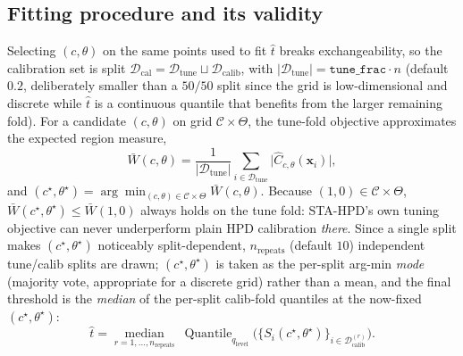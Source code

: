 \documentclass[10pt,twocolumn,a4paper]{article}
\begin{document}
\subsection{Fitting procedure and its validity}
Selecting $(c,\theta)$ on the same points used to fit $\hat t$ breaks exchangeability, so the
calibration set is split $\mathcal D_{\mathrm{cal}} = \mathcal D_{\mathrm{tune}}\sqcup\mathcal D_{\mathrm{calib}}$,
with $|\mathcal D_{\mathrm{tune}}| = \texttt{tune\_frac}\cdot n$ (default $0.2$, deliberately smaller
than a $50/50$ split since the grid is low-dimensional and discrete while $\hat t$ is a continuous
quantile that benefits from the larger remaining fold). For a candidate $(c,\theta)$ on grid
$\mathcal C\times\Theta$, the tune-fold objective approximates the expected region measure,
\begin{equation}
\bar W(c,\theta) = \frac{1}{|\mathcal D_{\mathrm{tune}}|}\sum_{i\in\mathcal D_{\mathrm{tune}}}
\big|\hat C_{c,\theta}(\bm x_i)\big|,
\end{equation}
and $(c^\star,\theta^\star) = \arg\min_{(c,\theta)\in\mathcal C\times\Theta}\bar W(c,\theta)$.
Because $(1,0)\in\mathcal C\times\Theta$, $\bar W(c^\star,\theta^\star)\le \bar W(1,0)$ always holds
on the tune fold: STA-HPD's own tuning objective can never underperform plain HPD calibration
\emph{there}. Since a single split makes $(c^\star,\theta^\star)$ noticeably split-dependent, $n_{\mathrm{repeats}}$
(default $10$) independent tune/calib splits are drawn; $(c^\star,\theta^\star)$ is taken as the
per-split arg-min \emph{mode} (majority vote, appropriate for a discrete grid) rather than a mean,
and the final threshold is the \emph{median} of the per-split calib-fold quantiles at the
now-fixed $(c^\star,\theta^\star)$:
\begin{equation}
\hat t = \operatorname*{median}_{r=1,\dots,n_{\mathrm{repeats}}}\ \operatorname{Quantile}_{q_{\mathrm{level}}}
\Big(\big\{S_i(c^\star,\theta^\star)\big\}_{i\in\mathcal D_{\mathrm{calib}}^{(r)}}\Big).
\label{eq:medianquantile}
\end{equation}
\end{document}
